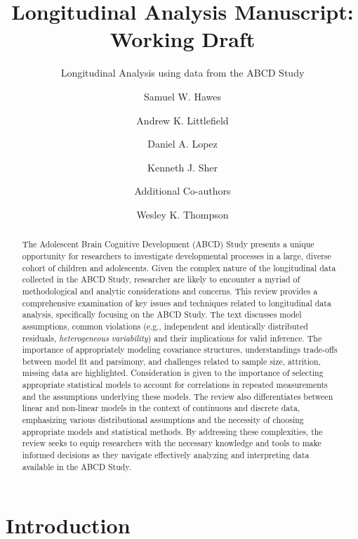 \documentclass[
  letterpaper,
  DIV=11,
  numbers=noendperiod]{scrartcl}
\title{Longitudinal Analysis Manuscript: Working Draft}
\subtitle{Longitudinal Analysis using data from the ABCD Study}
\author{Samuel W. Hawes \and Andrew K. Littlefield \and Daniel A.
Lopez \and Kenneth J. Sher \and Additional Co-authors \and Wesley K.
Thompson}
\date{}
\makeatletter
\renewcommand{\maketitle}{\bgroup\setlength{\parindent}{0pt}
\begin{flushleft}
  {\sffamily\huge\textbf{\MakeUppercase{\@title}}} \vspace{0.3cm} \newline
  {\Large {\@subtitle}} \newline
  \@author
\end{flushleft}\egroup
}
\makeatother
\begin{document}
\maketitle
\begin{abstract}
The Adolescent Brain Cognitive Development (ABCD) Study presents a
unique opportunity for researchers to investigate developmental
processes in a large, diverse cohort of children and adolescents. Given
the complex nature of the longitudinal data collected in the ABCD Study,
researcher are likely to encounter a myriad of methodological and
analytic considerations and concerns. This review provides a
comprehensive examination of key issues and techniques related to
longitudinal data analysis, specifically focusing on the ABCD Study. The
text discusses model assumptions, common violations (e.g., independent
and identically distributed residuals, \emph{heterogeneous}
\emph{variability}) and their implications for valid inference. The
importance of appropriately modeling covariance structures,
understandings trade-offs between model fit and parsimony, and
challenges related to sample size, attrition, missing data are
highlighted. Consideration is given to the importance of selecting
appropriate statistical models to account for correlations in repeated
measurements and the assumptions underlying these models. The review
also differentiates between linear and non-linear models in the context
of continuous and discrete data, emphasizing various distributional
assumptions and the necessity of choosing appropriate models and
statistical methods. By addressing these complexities, the review seeks
to equip researchers with the necessary knowledge and tools to make
informed decisions as they navigate effectively analyzing and
interpreting data available in the ABCD Study.
\end{abstract}
\pagestyle{mystyle}

\ifdefined\Shaded\renewenvironment{Shaded}{\begin{tcolorbox}[borderline west={3pt}{0pt}{shadecolor}, frame hidden, sharp corners, breakable, colback={codebgcolor}, enhanced, boxrule=0pt]}{\end{tcolorbox}}\fi

\hypertarget{introduction}{%
\section{Introduction}\label{introduction}}
\end{document}
